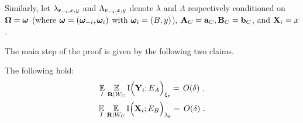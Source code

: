 Similarly, let $\lambda_{\mathbf{r}_{-i},x,y}$ and $\Lambda_{\mathbf{r}_{-i},x,y}$ denote $\lambda$ and $\Lambda$ respectively conditioned on ${\boldsymbol{\Omega}} = {\boldsymbol{\omega}}$ (where ${\boldsymbol{\omega}} = ({\boldsymbol{\omega}}_{-i},{\boldsymbol{\omega}}_i)$ with ${\boldsymbol{\omega}}_i = (B,y)$), $\mathbf{A}_C = \mathbf{a}_C, \mathbf{B}_C = \mathbf{b}_C$, and $\mathbf{X}_i = x$.
%

The main step of the proof is given by the following two claims. 

\begin{claim}\label{claim:xi-change-x}
The following hold: 
\begin{gather}
\operatorname*{\mathbb{E}}_I \,  \operatorname*{\mathbb{E}}_{\mathbf{R} | W_C} \mathrm{I} \Big (\mathbf{Y}_i ; E_A\Big )_{\xi_{\mathbf{r}}} = \, O(\delta)~, \label{eq:xi-change-1}\\
\operatorname*{\mathbb{E}}_I \,  \operatorname*{\mathbb{E}}_{\mathbf{R} | W_C} \mathrm{I} \Big (\mathbf{X}_i ; E_B\Big )_{\lambda_{\mathbf{r}}} = \, O(\delta)~. \label{eq:xi-change-2}
\end{gather}
\end{claim}

